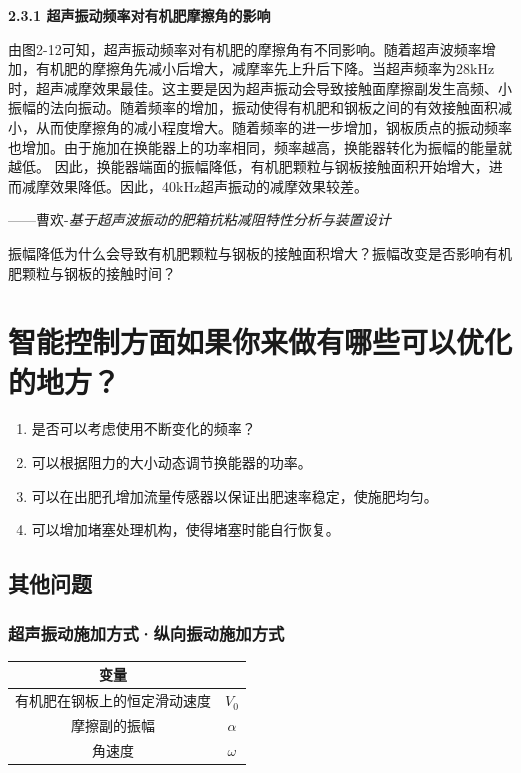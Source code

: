 \documentclass[zihao=5,UTF8,fontset=windows]{ctexart}
\begin{document}
\begin{tcolorbox}
		\begin{flushleft}
			\textbf{2.3.1 超声振动频率对有机肥摩擦角的影响}
		\end{flushleft}
		
		由图2-12可知，超声振动频率对有机肥的摩擦角有不同影响。随着超声波频率增加，有机肥的摩擦角先减小后增大，减摩率先上升后下降。当超声频率为28kHz时，超声减摩效果最佳。这主要是因为超声振动会导致接触面摩擦副发生高频、小振幅的法向振动。随着频率的增加，振动使得有机肥和钢板之间的有效接触面积减小，从而使摩擦角的减小程度增大。随着频率的进一步增加，钢板质点的振动频率也增加。由于施加在换能器上的功率相同，频率越高，换能器转化为振幅的能量就越低。{\color{red} 因此，换能器端面的振幅降低，有机肥颗粒与钢板接触面积开始增大，进而减摩效果降低。}因此，40kHz超声振动的减摩效果较差。

		\begin{flushright}
			——曹欢-\emph{基于超声波振动的肥箱抗粘减阻特性分析与装置设计}
		\end{flushright}

\end{tcolorbox}

	振幅降低为什么会导致有机肥颗粒与钢板的接触面积增大？振幅改变是否影响有机肥颗粒与钢板的接触时间？

\section{智能控制方面如果你来做有哪些可以优化的地方？}

\begin{enumerate}
	\item 是否可以考虑使用不断变化的频率？
	\item 可以根据阻力的大小动态调节换能器的功率。
	\item 可以在出肥孔增加流量传感器以保证出肥速率稳定，使施肥均匀。
	\item 可以增加堵塞处理机构，使得堵塞时能自行恢复。
\end{enumerate}

\subsection{其他问题}

\subsubsection{超声振动施加方式·纵向振动施加方式}

\begin{table}[H]
	\centering
	\begin{tabular}{cc}
		\toprule
		变量 & \\
		\midrule
		有机肥在钢板上的恒定滑动速度 & $V_0$ \\
		摩擦副的振幅 & $\alpha$ \\
		角速度 & $\omega$ \\
		\bottomrule
	\end{tabular}
\end{table}
\end{document}
